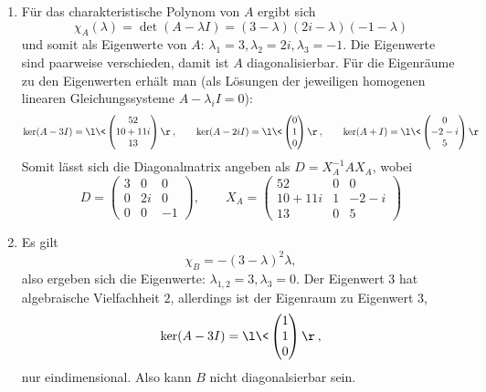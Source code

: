 \documentclass{mywork}
\begin{document}
\setcounter{section}{11}

\begin{aufgabe}
	\begin{enumerate}[$A$:]
		\item
			Für das charakteristische Polynom von $A$ ergibt sich
			\[
				\chi_A(\lambda) 
				= \det(A-\lambda I) 
				= (3-\lambda)(2i - \lambda)(-1-\lambda)
			\]
			und somit als Eigenwerte von $A$: $\lambda_1=3, \lambda_2 = 2i, \lambda_3 = -1$.
			Die Eigenwerte sind paarweise verschieden,
			damit ist $A$ diagonalisierbar.
			Für die Eigenräume zu den Eigenwerten erhält man (als Lösungen der jeweiligen homogenen linearen Gleichungssysteme $A-\lambda_i I = 0$):
			\[
				\ker(A-3I) = \l\< \begin{pmatrix}
					52 \\ 10 + 11i \\ 13
				\end{pmatrix}\r\>, \qquad
				\ker(A-2i I) = \l\< \begin{pmatrix}
					0 \\ 1 \\ 0
				\end{pmatrix}\r\>, \qquad
				\ker(A + I) = \l\< \begin{pmatrix}
					0 \\ -2 -i \\ 5
				\end{pmatrix}\r\>
			\]
			Somit lässt sich die Diagonalmatrix angeben als $D = X_A^{-1} A X_A$, wobei
			\[
				D = \begin{pmatrix}
					3 & 0 & 0 \\
					0 & 2i & 0 \\
					0 & 0 & -1
				\end{pmatrix}, \qquad
				X_A = \begin{pmatrix}
					52 & 0 & 0 \\
					10 + 11i & 1 & -2 -i \\
					13 & 0 & 5
				\end{pmatrix}
			\]
		\item
			Es gilt
			\[
				\chi_B = -(3-\lambda)^2 \lambda,
			\]
			also ergeben sich die Eigenwerte: $\lambda_{1,2} = 3, \lambda_3 = 0$.
			Der Eigenwert $3$ hat algebraische Vielfachheit $2$, allerdings ist der Eigenraum zu Eigenwert $3$,
			\[
				\ker (A-3I) = \l\< \begin{pmatrix}
					1 \\ 1 \\ 0
				\end{pmatrix}\r\>,
			\]
			nur eindimensional.
			Also kann $B$ nicht diagonalsierbar sein.
	\end{enumerate}
\end{aufgabe}
\end{document}
